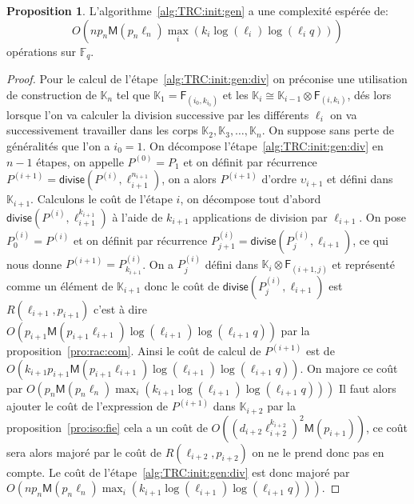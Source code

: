 \documentclass[10pt,a4paper]{book}
\theoremstyle{plain}
\theoremstyle{definition}
\theoremstyle{definition}
\theoremstyle{definition}
\newtheorem{prop}[thm]{Proposition}
\theoremstyle{definition}
\theoremstyle{remark}
\theoremstyle{remark}
\theoremstyle{definition}
\begin{document}
\begin{prop}
\label{pro:alg:TRC:init:gen}
L'algorithme~\ref{alg:TRC:init:gen} a une complexité espérée de:
\[
O(n p_{n}\mathsf{M}(p_{n}\ell_{n})\max_i(k_{i}\log(\ell_{i})\log(\ell_{i}q)))
\] 
opérations sur $\mathbb{F}_q$.
\end{prop}

\begin{proof}
Pour le calcul de l'étape~\ref{alg:TRC:init:gen:div} on préconise une 
utilisation de construction de $\mathbb{K}_n$ tel que $\mathbb{K}_1=
\mathsf{F}_{(i_0,k_{i_0})}$ et les 
$\mathbb{K}_i \cong \mathbb{K}_{i-1} \otimes \mathsf{F}_{(i,k_i)}$, dés lors lorsque 
l'on va calculer la division successive par les différents $\ell_i$ on va 
successivement travailler dans les corps 
$\mathbb{K}_2, \mathbb{K}_3, \dots, \mathbb{K}_n$. On suppose sans perte 
de généralités que l'on a $i_0=1$. On décompose 
l'étape~\ref{alg:TRC:init:gen:div} en $n-1$ 
étapes, on appelle $P^{(0)}=P_{1}$ et on définit par récurrence 
$P^{(i+1)}=\mathsf{divise}(P^{(i)},\ell_{i+1}^{n_{i+1}})$, on a alors 
$P^{(i+1)}$ d'ordre $\upsilon_{i+1}$ et défini dans $\mathbb{K}_{i+1}$. 
Calculons le coût de l'étape $i$, on décompose tout d'abord 
$\mathsf{divise}(P^{(i)},\ell_{i+1}^{k_{i+1}})$ à l'aide de $k_{i+1}$ 
applications de division par $\ell_{i+1}$. On pose $P^{(i)}_0=P^{(i)}$ et on 
définit par récurrence $P^{(i)}_{j+1}=\mathsf{divise}(P^{(i)}_{j},\ell_{i+1})$,
ce qui nous donne $P^{(i+1)}=P^{(i)}_{k_{i+1}}$. On a $P^{(i)}_{j}$ défini dans 
 $\mathbb{K}_i\otimes \mathsf{F}_{(i+1,j)}$ et représenté comme un élément de 
 $\mathbb{K}_{i+1}$ donc le coût de  $\mathsf{divise}(P^{(i)}_{j},\ell_{i+1})$ 
 est $R(\ell_{i+1},p_{i+1})$ c'est à dire 
 $O(p_{i+1} \mathsf{M}(p_{i+1}  \ell_{i+1})\log(\ell_{i+1})\log(\ell_{i+1}q))$
 par la proposition~\ref{pro:rac:com}. Ainsi le coût de calcul de $P^{(i+1)}$ 
 est de 
 $O(k_{i+1}p_{i+1} \mathsf{M}(p_{i+1}  \ell_{i+1})\log(\ell_{i+1})\log(\ell_{i+1}q))$.
 On majore ce coût par $O(p_{n}\mathsf{M}(p_{n}\ell_{n})\max_i(k_{i+1}\log(\ell_{i+1})\log(\ell_{i+1}q)))$
 Il faut alors ajouter le coût de l'expression de $P^{(i+1)}$ dans 
 $\mathbb{K}_{i+2}$ par la proposition~\ref{pro:iso:fie}
 cela a un coût de $O((d_{i+2}\ell_{i+2}^{k_{i+2}})^2\mathsf{M}(p_{i+1}))$,
 ce coût sera alors majoré par le coût de $R(\ell_{i+2},p_{i+2})$ on ne le 
 prend donc pas en compte. 
 Le coût de l'étape~\ref{alg:TRC:init:gen:div} est donc majoré par 
 $O(n p_{n}\mathsf{M}(p_{n}\ell_{n})\max_i(k_{i+1}\log(\ell_{i+1})\log(\ell_{i+1}q)))$. 


\end{proof}
\end{document}

